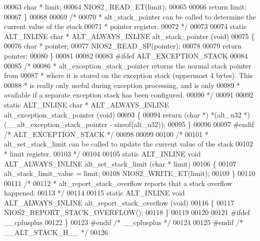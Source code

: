 \begin{DoxyCode}
00063   \textcolor{keywordtype}{char} * limit;
00064   NIOS2_READ_ET(limit);
00065 
00066   \textcolor{keywordflow}{return} limit; 
00067 \}
00068 
00069 \textcolor{comment}{/*}
00070 \textcolor{comment}{ * alt\_stack\_pointer can be called to determine the current value of the stack}
00071 \textcolor{comment}{ * pointer register.}
00072 \textcolor{comment}{ */}
00073 
00074 \textcolor{keyword}{static} ALT_INLINE \textcolor{keywordtype}{char} * ALT_ALWAYS_INLINE alt_stack_pointer (\textcolor{keywordtype}{void})
00075 \{
00076   \textcolor{keywordtype}{char} * pointer;
00077   NIOS2_READ_SP(pointer);
00078 
00079   \textcolor{keywordflow}{return} pointer; 
00080 \}
00081 
00082 
00083 \textcolor{preprocessor}{#ifdef ALT\_EXCEPTION\_STACK}
00084 
00085 \textcolor{comment}{/*}
00086 \textcolor{comment}{ * alt\_exception\_stack\_pointer returns the normal stack pointer from}
00087 \textcolor{comment}{ * where it is stored on the exception stack (uppermost 4 bytes).  This}
00088 \textcolor{comment}{ * is really only useful during exception processing, and is only}
00089 \textcolor{comment}{ * available if a separate exception stack has been configured.}
00090 \textcolor{comment}{ */}
00091 
00092 \textcolor{keyword}{static} ALT_INLINE \textcolor{keywordtype}{char} * ALT_ALWAYS_INLINE alt\_exception\_stack\_pointer (\textcolor{keywordtype}{void})
00093 \{
00094   \textcolor{keywordflow}{return} (\textcolor{keywordtype}{char} *) *(alt_u32 *)(\_\_alt\_exception\_stack\_pointer - \textcolor{keyword}{sizeof}(alt_u32));
00095 \}
00096 
00097 \textcolor{preprocessor}{#endif }\textcolor{comment}{/* ALT\_EXCEPTION\_STACK */}\textcolor{preprocessor}{}
00098 
00099 
00100 \textcolor{comment}{/*}
00101 \textcolor{comment}{ * alt\_set\_stack\_limit can be called to update the current value of the stack}
00102 \textcolor{comment}{ * limit register.}
00103 \textcolor{comment}{ */}
00104 
00105 \textcolor{keyword}{static} ALT_INLINE \textcolor{keywordtype}{void} ALT_ALWAYS_INLINE alt_set_stack_limit (\textcolor{keywordtype}{char} * limit)
00106 \{
00107   alt\_stack\_limit\_value = limit;
00108   NIOS2_WRITE_ET(limit);
00109 \}
00110 
00111 \textcolor{comment}{/*}
00112 \textcolor{comment}{ * alt\_report\_stack\_overflow reports that a stack overflow happened.}
00113 \textcolor{comment}{ */}
00114 
00115 \textcolor{keyword}{static} ALT_INLINE \textcolor{keywordtype}{void} ALT_ALWAYS_INLINE alt_report_stack_overflow (\textcolor{keywordtype}{void})
00116 \{
00117   NIOS2_REPORT_STACK_OVERFLOW();
00118 \}
00119 
00120 
00121 \textcolor{preprocessor}{#ifdef \_\_cplusplus}
00122 \}
00123 \textcolor{preprocessor}{#endif }\textcolor{comment}{/* \_\_cplusplus */}\textcolor{preprocessor}{}
00124 
00125 \textcolor{preprocessor}{#endif }\textcolor{comment}{/* \_\_ALT\_STACK\_H\_\_ */}\textcolor{preprocessor}{}
00126 
\end{DoxyCode}
